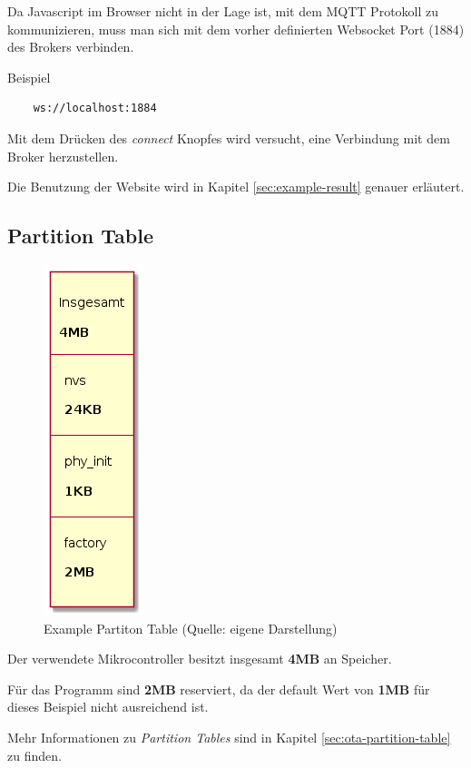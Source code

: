 Da Javascript im Browser nicht in der Lage ist, mit dem MQTT Protokoll zu kommunizieren, muss man sich mit dem vorher definierten Websocket Port (1884) des Brokers verbinden.

Beispiel
\begin{verbatim}
    ws://localhost:1884
\end{verbatim}

Mit dem Drücken des \textit{connect} Knopfes wird versucht, eine Verbindung mit dem Broker herzustellen.

Die Benutzung der Website wird in Kapitel \ref{sec:example-result} genauer erläutert.

\subsection{Partition Table}

\begin{figure}[H]
    \begin{center}
        \includegraphics[scale=.6]{diagrams/mqtt_dht22_example_partitions.png}
        \caption{Example Partiton Table (Quelle: eigene Darstellung)}
        \label{abb:example-partitions}
    \end{center}
\end{figure}

Der verwendete Mikrocontroller besitzt insgesamt \textbf{4MB} an Speicher.

Für das Programm sind \textbf{2MB} reserviert, da der default Wert von \textbf{1MB} für dieses Beispiel nicht ausreichend ist. 

Mehr Informationen zu \textit{Partition Tables} sind in Kapitel \ref{sec:ota-partition-table} zu finden.

